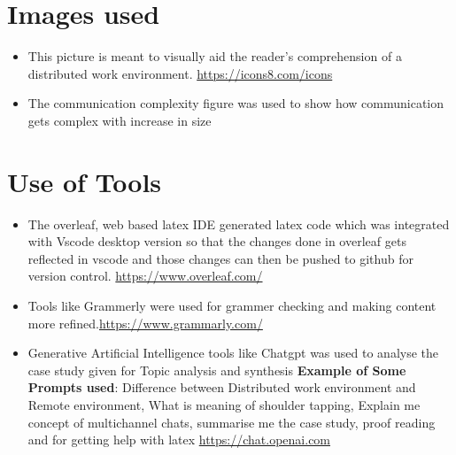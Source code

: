\documentclass{llncs}
\begin{document}
\begin{subappendices}
\renewcommand{\thesection}{\Alph{section}}
\section{Images used}
\begin{itemize}
    \item This picture is meant to visually aid the reader's comprehension of a distributed work environment. \url{https://icons8.com/icons}
    \item The communication complexity figure was used to show how communication gets complex with increase in  size
\end{itemize}
\section{Use of Tools}
\begin{itemize}
    \item The overleaf, web based latex IDE generated latex code which was integrated with Vscode desktop version so that the changes done in overleaf gets reflected in vscode and those changes can then be pushed to github for version control. \url{https://www.overleaf.com/} 
    \item Tools like Grammerly were used for grammer checking and making content more refined.\url{https://www.grammarly.com/}
    \item Generative Artificial Intelligence tools like Chatgpt was used to analyse the case study given for Topic analysis and synthesis \textbf{Example of Some Prompts used}: Difference between Distributed work environment and Remote environment, What is meaning of shoulder tapping, Explain me concept of multichannel chats, summarise me the case study, proof reading and for getting help with latex \url{https://chat.openai.com}
\end{itemize}

\end{subappendices}
\end{document}
